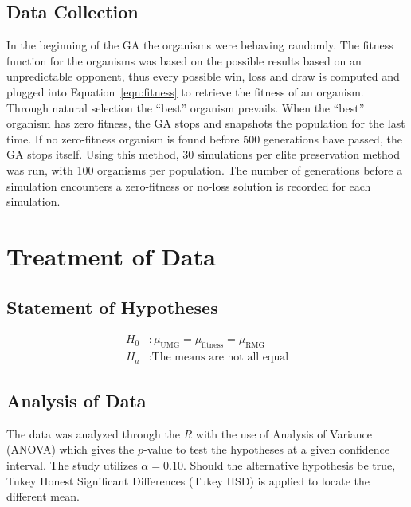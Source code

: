 \documentclass{strrespaper-trad}
\begin{document}
			\subsection{Data Collection}
				In the beginning of the GA the organisms were behaving randomly.
				The fitness function for the organisms was based on the possible results based on an unpredictable opponent, thus every possible win, loss and draw is computed and plugged into Equation~\ref{eqn:fitness} to retrieve the fitness of an organism.
				Through natural selection the \enquote{best} organism prevails.
				When the \enquote{best} organism has zero fitness, the GA stops and snapshots the population for the last time.
				If no zero-fitness organism is found before 500 generations have passed, the GA stops itself.
				Using this method, 30 simulations per elite preservation method was run, with 100 organisms per population.
				The number of generations before a simulation encounters a zero-fitness or no-loss solution is recorded for each simulation.

		\section{Treatment of Data}
			\subsection{Statement of Hypotheses} \vspace{-2em}
				\begin{align*}
					H_0 & : \mu_\mathrm{UMG} = \mu_\mathrm{fitness} = \mu_\mathrm{RMG} \\
					H_a & : \text{The means are not all equal}
				\end{align*}
			\subsection{Analysis of Data}
				The data was analyzed through the $R$ with the use of Analysis of Variance (ANOVA) which gives the $p$-value to test the hypotheses at a given confidence interval.
				The study utilizes $\alpha = 0.10$.
				Should the alternative hypothesis be true, Tukey Honest Significant Differences (Tukey HSD) is applied to locate the different mean.
\end{document}
